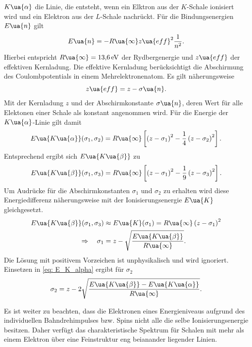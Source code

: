 $K\ua{\alpha}$ die Linie, die entsteht, wenn ein Elktron aus der $K$-Schale ionisiert wird und ein Elektron aus der $L$-Schale
nachrückt. Für die Bindungsenergien $E\ua{n}$ gilt
\begin{equation}
  E\ua{n} = -R\ua{\infty} z\ua{eff}^2 \frac{1}{n^2}.
  \label{eq: E_niveaus}
\end{equation}
Hierbei entspricht $R\ua{\infty} = \SI{13.6}{\eV}$ der Rydbergenergie und $z\ua{eff}$ der effektiven Kernladung. Die effektive
Kernladung berücksichtigt die Abschirmung des Coulombpotentials in einem Mehrelektronenatom. Es gilt näherungsweise
\begin{equation}
  z\ua{eff} = z - \sigma\ua{n}.
  \label{eq: abschirmkonstante}
\end{equation}
Mit der Kernladung $z$ und der Abschirmkonstante $\sigma\ua{n}$, deren Wert für alle Elektonen einer Schale als konstant angenommen wird.
Für die Energie der $K\ua{\alpha}$-Linie gilt damit
\begin{equation}
  E\ua{K\ua{\alpha}}(\sigma_1, \sigma_2) = R\ua{\infty} \left[\left(z - \sigma_1\right)^2 -  \frac{1}{4}\left(z - \sigma_2\right)^2\right].
  \label{eq: E_K_alpha}
\end{equation}
Entsprechend ergibt sich $E\ua{K\ua{\beta}}$ zu
\begin{equation}
  E\ua{K\ua{\beta}}(\sigma_1, \sigma_3) = R\ua{\infty} \left[\left(z - \sigma_1\right)^2 -  \frac{1}{9}\left(z - \sigma_3\right)^2\right].
  \label{eq: E_K_beta}
\end{equation}
Um Audrücke für die Abschirmkonstanten $\sigma_1$ und $\sigma_2$ zu erhalten wird diese Energiedifferenz
näherungsweise mit der Ionisierungsenergie $E\ua{K}$ gleichgesetzt.
\begin{align}
  \begin{aligned}
  E\ua{K\ua{\beta}}(\sigma_1, \sigma_3) &\approx E\ua{K}(\sigma_1) = R\ua{\infty} \left(z - \sigma_1\right)^2 \\
  \Rightarrow \quad \sigma_1 &= z - \sqrt{\frac{E\ua{K\ua{\beta}}}{R\ua{\infty}}}.
\end{aligned}
\end{align}
Die Lösung mit positivem Vorzeichen ist unphysikalisch und wird ignoriert. Einsetzen in \eqref{eq: E_K_alpha} ergibt für $\sigma_2$
\begin{equation}
  \sigma_2 = z - 2\sqrt{\frac{ E\ua{K\ua{\beta}} - E\ua{K\ua{\alpha}} }{ R\ua{\infty} } }.
\end{equation}

Es ist weiter zu beachten, dass die Elektronen eines Energieniveaus
aufgrund des individuellen Bahndrehimpulses bzw. Spins nicht alle die selbe Ionisierungsenergie besitzen. Daher verfügt das charakteristische
Spektrum für Schalen mit mehr als einem Elektron über eine Feinstruktur eng beianander liegender Linien.

